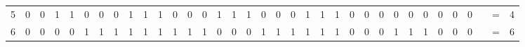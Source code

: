\documentclass[a4paper,3p,times,authoryear]{elsarticle}
\begin{document}
\begin{table}[H]
{\begin{tabular}{|l|l|l|l|l|l|l|l|l|l|l|l|l|l|l|l|l|l|l|l|l|l|l|l|l|l|l|l|l|l|l|llll|}
\multicolumn{1}{|c|}{5} & \multicolumn{1}{c|}{0} & \multicolumn{1}{c|}{0} & \multicolumn{1}{c|}{\cellcolor{blue!25}1} & \multicolumn{1}{c|}{\cellcolor{blue!25}1} & \multicolumn{1}{c|}{0} & \multicolumn{1}{c|}{0} & \multicolumn{1}{c|}{0} & \multicolumn{1}{c|}{\cellcolor{blue!25}1} & \multicolumn{1}{c|}{\cellcolor{blue!25}1} & \multicolumn{1}{c|}{\cellcolor{blue!25}1} & \multicolumn{1}{c|}{0} & \multicolumn{1}{c|}{0} & \multicolumn{1}{c|}{0} & \multicolumn{1}{c|}{\cellcolor{blue!25}1} & \multicolumn{1}{c|}{\cellcolor{blue!25}1} & \multicolumn{1}{c|}{\cellcolor{blue!25}1} & \multicolumn{1}{c|}{0} & \multicolumn{1}{c|}{0} & \multicolumn{1}{c|}{0} & \multicolumn{1}{c|}{\cellcolor{blue!25}1} & \multicolumn{1}{c|}{\cellcolor{blue!25}1} & \multicolumn{1}{c|}{\cellcolor{blue!25}1} & \multicolumn{1}{c|}{0} & \multicolumn{1}{c|}{0} & \multicolumn{1}{c|}{0} & \multicolumn{1}{c|}{0} & \multicolumn{1}{c|}{0} & \multicolumn{1}{c|}{0} & \multicolumn{1}{c|}{0} & \multicolumn{1}{c|}{0} & \multicolumn{1}{c}{0} & \multicolumn{1}{c}{} & \multicolumn{1}{c}{=} & \multicolumn{1}{c|}{\cellcolor{blue!25}4} \\ 
\cline{1-32}\cline{34-35}
\multicolumn{1}{|c|}{6} & \multicolumn{1}{c|}{0} & \multicolumn{1}{c|}{0} & \multicolumn{1}{c|}{0} & \multicolumn{1}{c|}{0} & \multicolumn{1}{c|}{\cellcolor{blue!25}1} & \multicolumn{1}{c|}{\cellcolor{blue!25}1} & \multicolumn{1}{c|}{\cellcolor{blue!25}1} & \multicolumn{1}{c|}{\cellcolor{blue!25}1} & \multicolumn{1}{c|}{\cellcolor{blue!25}1} & \multicolumn{1}{c|}{\cellcolor{blue!25}1} & \multicolumn{1}{c|}{\cellcolor{blue!25}1} & \multicolumn{1}{c|}{\cellcolor{blue!25}1} & \multicolumn{1}{c|}{\cellcolor{blue!25}1} & \multicolumn{1}{c|}{0} & \multicolumn{1}{c|}{0} & \multicolumn{1}{c|}{0} & \multicolumn{1}{c|}{\cellcolor{blue!25}1} & \multicolumn{1}{c|}{\cellcolor{blue!25}1} & \multicolumn{1}{c|}{\cellcolor{blue!25}1} & \multicolumn{1}{c|}{\cellcolor{blue!25}1} & \multicolumn{1}{c|}{\cellcolor{blue!25}1} & \multicolumn{1}{c|}{\cellcolor{blue!25}1} & \multicolumn{1}{c|}{0} & \multicolumn{1}{c|}{0} & \multicolumn{1}{c|}{0} & \multicolumn{1}{c|}{\cellcolor{blue!25}1} & \multicolumn{1}{c|}{\cellcolor{blue!25}1} & \multicolumn{1}{c|}{\cellcolor{blue!25}1} & \multicolumn{1}{c|}{0} & \multicolumn{1}{c|}{0} & \multicolumn{1}{c}{0} & \multicolumn{1}{c}{} & \multicolumn{1}{c}{=} & \multicolumn{1}{c|}{\cellcolor{blue!25}6} \\ 
\cline{1-32}\cline{34-35}

\end{tabular}}
\end{table}
\end{document}
